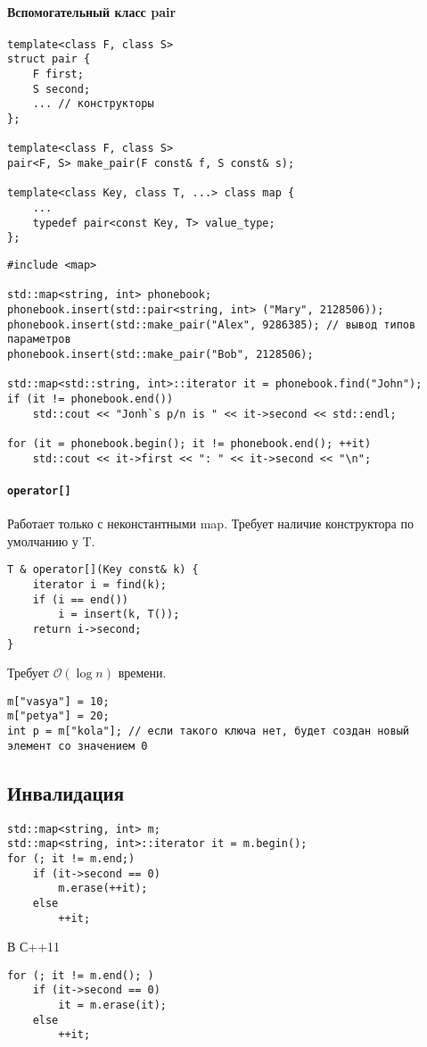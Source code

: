 \paragraph{Вспомогательный класс pair}
\begin{verbatim}
template<class F, class S>
struct pair {
	F first;
	S second;
	... // конструкторы
};

template<class F, class S>
pair<F, S> make_pair(F const& f, S const& s);

template<class Key, class T, ...> class map {
	...
	typedef pair<const Key, T> value_type;
};
\end{verbatim}
\begin{verbatim}
#include <map>

std::map<string, int> phonebook;
phonebook.insert(std::pair<string, int> ("Mary", 2128506));
phonebook.insert(std::make_pair("Alex", 9286385); // вывод типов параметров
phonebook.insert(std::make_pair("Bob", 2128506);

std::map<std::string, int>::iterator it = phonebook.find("John");
if (it != phonebook.end()) 
    std::cout << "Jonh`s p/n is " << it->second << std::endl;

for (it = phonebook.begin(); it != phonebook.end(); ++it)
    std::cout << it->first << ": " << it->second << "\n";
\end{verbatim}
\paragraph{\texttt{operator[]}}
Работает только с неконстантными map.
Требует наличие конструктора по умолчанию у T.
\begin{verbatim}
T & operator[](Key const& k) {
    iterator i = find(k);
	if (i == end())
	    i = insert(k, T());
    return i->second;
}
\end{verbatim}
Требует $ \mathcal{O}(\log n)$ времени.
\begin{verbatim}
m["vasya"] = 10;
m["petya"] = 20;
int p = m["kola"]; // если такого ключа нет, будет создан новый элемент со значением 0
\end{verbatim}
\subsection{Инвалидация}
\begin{verbatim}
std::map<string, int> m;
std::map<string, int>::iterator it = m.begin();
for (; it != m.end;)
    if (it->second == 0)
	    m.erase(++it);
	else
	    ++it;
\end{verbatim}
В С++11
\begin{verbatim}
for (; it != m.end(); )
    if (it->second == 0) 
	    it = m.erase(it);
    else
	    ++it;
\end{verbatim}
